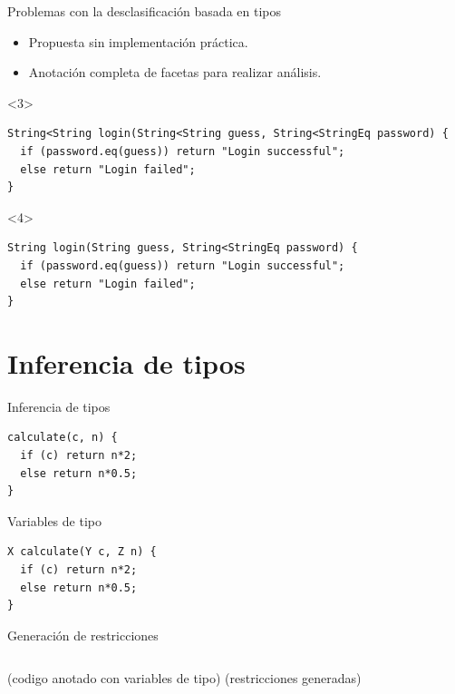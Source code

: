 \documentclass[aspectratio=169,10pt]{beamer}
\begin{document}
\begin{frame}[fragile]{Problemas con la desclasificación basada en tipos}
	\begin{itemize}
		\item Propuesta sin implementación práctica. \pause
		\item Anotación completa de facetas para realizar análisis. \pause
	\end{itemize}
	\vspace{1cm}
	\begin{onlyenv}
\begin{lstlisting}[basicstyle=\fontsize{9}{9}\ttfamily]
String<String login(String<String guess, String<StringEq password) {
  if (password.eq(guess)) return "Login successful";
  else return "Login failed";
}
\end{lstlisting}

	\end{onlyenv}
	\begin{onlyenv}
\begin{lstlisting}[basicstyle=\fontsize{9}{9}\ttfamily]
String login(String guess, String<StringEq password) {
  if (password.eq(guess)) return "Login successful";
  else return "Login failed";
}
\end{lstlisting}

	\end{onlyenv}
\end{frame}

\section{Inferencia de tipos}

\begin{frame}[fragile]{Inferencia de tipos}
\begin{lstlisting}[basicstyle=\fontsize{9}{9}\ttfamily]
calculate(c, n) {
  if (c) return n*2;
  else return n*0.5;
}
\end{lstlisting}
\end{frame}

\begin{frame}[fragile]{Variables de tipo}
\begin{lstlisting}[basicstyle=\fontsize{9}{9}\ttfamily]
X calculate(Y c, Z n) {
  if (c) return n*2;
  else return n*0.5;
}
\end{lstlisting}
\end{frame}

\begin{frame}[fragile]{Generación de restricciones}
	\begin{columns}[T,onlytextwidth]
		(codigo anotado con variables de tipo)
		(restricciones generadas)
	\end{columns}
\end{frame}
\end{document}
